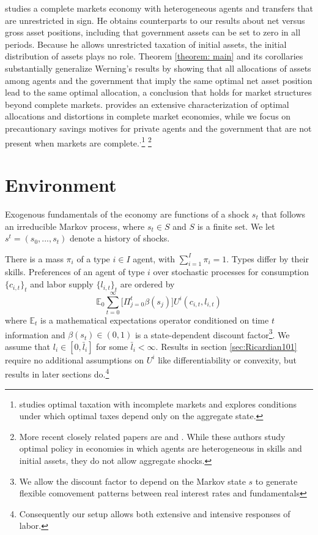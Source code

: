 \documentclass[thmsb,11pt]{article}
\begin{document}
\citet{Wer07a} studies a complete markets economy with heterogeneous agents
and transfers that are unrestricted in sign. He obtains counterparts to our
results about net versus gross asset positions, including that government
assets can be set to zero in all periods. Because he allows unrestricted
taxation of initial assets, the initial distribution of assets plays no
role. Theorem \ref{theorem: main} and its corollaries substantially
generalize Werning's results by showing that all allocations of assets among
agents and the government that imply the same optimal net asset position
lead to the same optimal allocation, a conclusion that holds for market
structures beyond complete markets. \citet{Wer07a} provides an extensive
characterization of optimal allocations and distortions in complete market
economies, while we focus on precautionary savings motives for private
agents and the government that are not present when markets are complete.$%
^{,}$\footnote{%
\cite{Werning2012} studies optimal taxation with incomplete markets and explores
conditions under which optimal taxes depend only on the aggregate state.}
\footnote{%
More recent closely related papers are \citet{Azzimonti2008,Azzimonti2008a} and \citet{Correia2010}. While these authors study optimal policy in
 economies in which agents are heterogeneous in skills and initial assets, they
  do not allow aggregate shocks.}


\section{Environment\label{Sec: environment}}

\smallskip  %
Exogenous fundamentals
of the
economy are  functions of a shock  $s_{t}$  that follows an irreducible Markov process, where $s_{t}\in S$ and $S$ is a finite set. We let $s^{t}=\left(
s_{0},...,s_{t}\right) $ denote a history of shocks.

There is a mass $\pi _{i}$
of a type $i\in I$ agent, with $\sum_{i=1}^{I}\pi _{i}=1.$ Types differ by their skills.
Preferences of an
agent of type $i$ over stochastic processes for consumption $\{c_{i,t}\}_t$
and labor supply $\{l_{i,t}\}_t$ are ordered by
\begin{equation}
\mathbb{E}_{0}\sum_{t=0}^{\infty } \bigl[\Pi_{j=0}^t \beta(s_j)\bigr] U^{i}\left(
c_{i,t},l_{i,t}\right)  \label{utility lifetime}
\end{equation}%
where $\mathbb{E}_{t}$ is a mathematical expectations operator conditioned
on time $t$ information and $\beta(s_t) \in \left( 0,1\right) $ is a state-dependent discount
factor\footnote{We allow the discount factor to depend on the Markov state $s$ to generate flexible  comovement patterns between real interest rates and fundamentals}. We assume that $l_{i}\in \left[ 0,\bar{l}_{i}\right] $ for some $%
\bar{l}_{i}<\infty .$ Results in section  \ref{sec:Ricardian101} require no
additional assumptions on $U^{i}$ like  differentiability or convexity, but results in later sections do.\footnote{Consequently  our setup allows both extensive and intensive responses of labor.}
\end{document}
